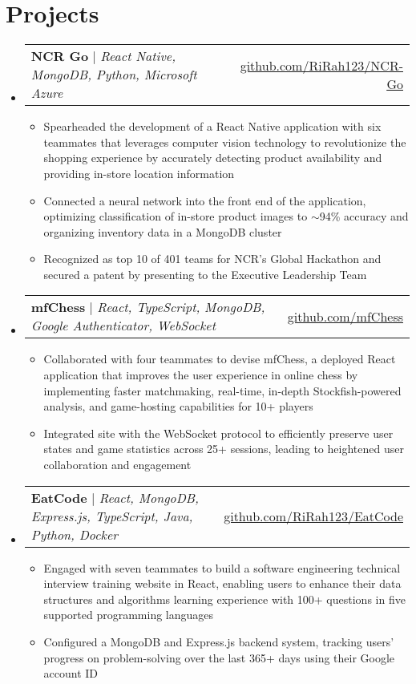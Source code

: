 \documentclass[letterpaper,10pt]{article}
\makeatletter
\newcommand{\resumeItem}[1]{
  \item\small{
    {#1 \vspace{-2pt}}
  }
}
\newcommand{\resumeProjectHeading}[2]{
    \item
    \begin{tabular*}{0.97\textwidth}{l@{\extracolsep{\fill}}r}
      \small#1 & #2 \\
    \end{tabular*}\vspace{-7pt}
}
\newcommand{\resumeSubHeadingListStart}{\begin{itemize}[leftmargin=0.15in, label={}]}
\newcommand{\resumeSubHeadingListEnd}{\end{itemize}}
\newcommand{\resumeItemListStart}{\begin{itemize}}
\newcommand{\resumeItemListEnd}{\end{itemize}\vspace{-5pt}}
\makeatother
\begin{document}
\section{Projects}
    \resumeSubHeadingListStart
        \resumeProjectHeading
          {\textbf{NCR Go} $|$ \emph{React Native, MongoDB, Python, Microsoft Azure}}{\href{https://github.com/RiRah123/NCR-Go}{\underline{github.com/RiRah123/NCR-Go}}}
          \resumeItemListStart
            \resumeItem{Spearheaded the development of a React Native application with six teammates that leverages computer vision technology to revolutionize the shopping experience by accurately detecting product availability and providing in-store location information}
            \resumeItem{Connected a neural network into the front end of the application, optimizing classification of in-store product images to $\sim$94\% accuracy and organizing inventory data in a MongoDB cluster}
            \resumeItem{Recognized as top 10 of 401 teams for NCR's Global Hackathon and secured a patent by presenting to the Executive Leadership Team}
          \resumeItemListEnd

        \resumeProjectHeading
          {\textbf{mfChess} $|$ \emph{React, TypeScript, MongoDB, Google Authenticator, WebSocket}}{\href{https://github.com/mfChess}{\underline{github.com/mfChess}}}
          \resumeItemListStart
            \resumeItem{Collaborated with four teammates to devise mfChess, a deployed React application that improves the user experience in online chess by implementing faster matchmaking, real-time, in-depth Stockfish-powered analysis, and game-hosting capabilities for 10+ players}
            \resumeItem{Integrated site with the WebSocket protocol to efficiently preserve user states and game statistics across 25+ sessions, leading to heightened user collaboration and engagement}
          \resumeItemListEnd
          
      \resumeProjectHeading
          {\textbf{EatCode} $|$ \emph{React, MongoDB, Express.js, TypeScript, Java, Python, Docker}}{\href{https://github.com/RiRah123/EatCode}{\underline{github.com/RiRah123/EatCode}}}
          \resumeItemListStart
            \resumeItem{Engaged with seven teammates to build a software engineering technical interview training website in React, enabling users to enhance their data structures and algorithms learning experience with 100+ questions in five supported programming languages}
            \resumeItem{Configured a MongoDB and Express.js backend system, tracking users' progress on problem-solving over the last 365+ days using their Google account ID}
          \resumeItemListEnd
    \resumeSubHeadingListEnd
\end{document}

